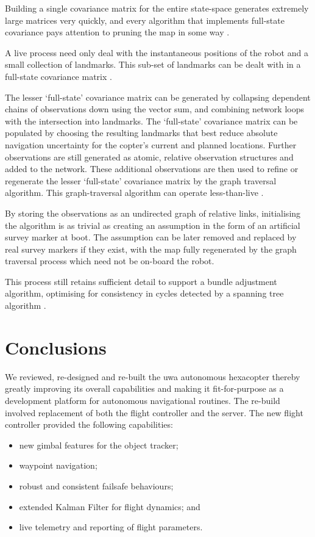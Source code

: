 \documentclass[a4paper, 11pt, titlepage]{article}
\begin{document}
        Building a single covariance matrix for the entire state-space generates extremely large matrices very quickly, and every algorithm that implements full-state covariance pays attention to pruning the map in some way\cite{monoslam} \cite{airshipSLAM}.
        
        A live process need only deal with the instantaneous positions of the robot and a small collection of landmarks. This sub-set of landmarks can be dealt with in a full-state covariance matrix \cite{monoslam}.
        
        The lesser `full-state' covariance matrix can be generated by collapsing dependent chains of observations down using the vector sum, and combining network loops with the intersection into landmarks.  The `full-state' covariance matrix can be populated by choosing the resulting landmarks that best reduce absolute navigation uncertainty for the copter's current and planned locations.  Further observations are still generated as atomic, relative observation structures and added to the network.  These additional observations are then used to refine or regenerate the lesser `full-state' covariance matrix by the graph traversal algorithm.
        This graph-traversal algorithm can operate less-than-live \cite{SLAMgraph}.

        By storing the observations as an undirected graph of relative links, initialising the algorithm is as trivial as creating an assumption in the form of an artificial survey marker at boot.
        The assumption can be later removed and replaced by real survey markers if they exist, with the map fully regenerated by the graph traversal process which need not be on-board the robot.

        This process still retains sufficient detail to support a bundle adjustment algorithm, optimising for consistency in cycles detected by a spanning tree algorithm \cite{SLAMgraph}.



\section{Conclusions}

We reviewed, re-designed and re-built the \gls{uwa} autonomous hexacopter thereby greatly improving its overall capabilities and making it fit-for-purpose as a development platform for autonomous navigational routines. The re-build involved replacement of both the flight controller and the server. The new flight controller provided the following capabilities:
\begin{itemize}
  \item new gimbal features for the object tracker;
  \item waypoint navigation;
  \item robust and consistent failsafe behaviours;
  \item extended Kalman Filter for flight dynamics; and
  \item live telemetry and reporting of flight parameters.
\end{itemize}
\end{document}
